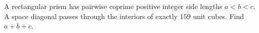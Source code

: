 A rectangular prism has pairwise coprime positive integer side lengths $a<b<c$. A space diagonal passes through the interiors of exactly $159$ unit cubes. Find $a+b+c$.

